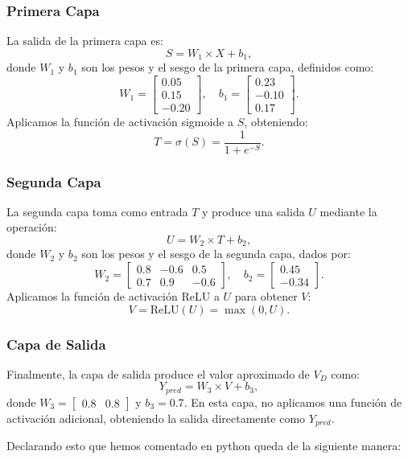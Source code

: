 \documentclass[paper=a4, fontsize=11pt]{scrartcl} %
\numberwithin{equation}{section} %
\numberwithin{figure}{section} %
\numberwithin{table}{section} %
\begin{document}
\subsubsection{Primera Capa}

La salida de la primera capa es:
\[
S = W_1 \times X + b_1,
\]
donde $W_1$ y $b_1$ son los pesos y el sesgo de la primera capa, definidos como:
\[
W_1 = \begin{bmatrix} 0.05 \\ 0.15 \\ -0.20 \end{bmatrix}, \quad b_1 = \begin{bmatrix} 0.23 \\ -0.10 \\ 0.17 \end{bmatrix}.
\]
Aplicamos la función de activación sigmoide a $S$, obteniendo:
\[
T = \sigma(S) = \frac{1}{1 + e^{-S}}.
\]

\subsubsection{Segunda Capa}

La segunda capa toma como entrada $T$ y produce una salida $U$ mediante la operación:
\[
U = W_2 \times T + b_2,
\]
donde $W_2$ y $b_2$ son los pesos y el sesgo de la segunda capa, dados por:
\[
W_2 = \begin{bmatrix} 0.8 & -0.6 & 0.5 \\ 0.7 & 0.9 & -0.6 \end{bmatrix}, \quad b_2 = \begin{bmatrix} 0.45 \\ -0.34 \end{bmatrix}.
\]
Aplicamos la función de activación ReLU a $U$ para obtener $V$:
\[
V = \text{ReLU}(U) = \max(0, U).
\]

\subsubsection{Capa de Salida}

Finalmente, la capa de salida produce el valor aproximado de $V_D$ como:
\[
Y_{pred} = W_3 \times V + b_3,
\]
donde $W_3 = \begin{bmatrix} 0.8 & 0.8 \end{bmatrix}$ y $b_3 = 0.7$. En esta capa, no aplicamos una función de activación adicional, obteniendo la salida directamente como $Y_{pred}$.

Declarando esto que hemos comentado en python queda de la siguiente manera:
\end{document}
